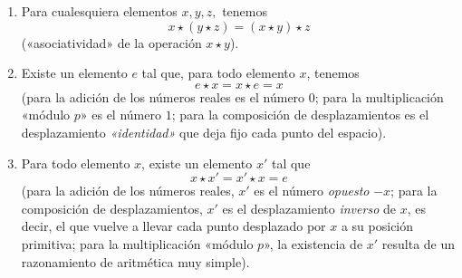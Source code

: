 \documentclass[a4paper, 12pt, draft]{article}
\begin{document}
\begin{enumerate} [\indent a) ]
\vspace{- 1em}

\item Para cualesquiera elementos $x, y, z,$ tenemos $$ x\star (y \star z)=(x \star y) \star z $$ («asociatividad» de la operación $x\star y$).

\item Existe un elemento $e$ tal que, para todo elemento $x$, tenemos $$ e\star x=x \star e=x $$ (para la adición de los números reales es el número $0$; para la multiplicación «módulo $p$» es el número $1$; para la composición de desplazamientos es el desplazamiento \textit{«identidad»} que deja fijo cada punto del espacio).

\item Para todo elemento $x$, existe un elemento $x'$ tal que $$ x\star x' = x'\star x=e $$ (para la adición de los números reales, $x'$ es el número \textit{opuesto} $-x$; para la composición de desplazamientos, $x'$ es el desplazamiento \textit{inverso} de $x$, es decir, el que vuelve a llevar cada punto desplazado por $x$ a su posición primitiva; para la multiplicación «módulo $p$», la existencia de $x'$ resulta de un razonamiento de aritmética muy simple).

\end{enumerate}
\end{document}
